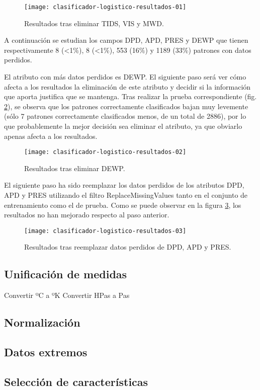 \begin{figure}[ht]
    \centering
    \texttt{[image: clasificador-logistico-resultados-01]}
    \caption{Resultados tras eliminar TIDS, VIS y MWD.}
    \label{fig:clasificador-logistico-resultados-01}
\end{figure}

A continuación se estudian los campos DPD, APD, PRES y DEWP que tienen respectivamente 8 (<1\%), 8 (<1\%), 553 (16\%) y 1189 (33\%) patrones con datos perdidos.

El atributo con más datos perdidos es DEWP. El siguiente paso será ver cómo afecta a los resultados la eliminación de este atributo y decidir si la información que aporta justifica que se mantenga. Tras realizar la prueba correspondiente (fig. \ref{fig:clasificador-logistico-resultados-02}), se observa que los patrones correctamente clasificados bajan muy levemente (sólo 7 patrones correctamente clasificados menos, de un total de 2886), por lo que probablemente la mejor decisión sea eliminar el atributo, ya que obviarlo apenas afecta a los resultados.

\begin{figure}[ht]
    \centering
    \texttt{[image: clasificador-logistico-resultados-02]}
    \caption{Resultados tras eliminar DEWP.}
    \label{fig:clasificador-logistico-resultados-02}
\end{figure}

El siguiente paso ha sido reemplazar los datos perdidos de los atributos DPD, APD y PRES utilizando el filtro ReplaceMissingValues tanto en el conjunto de entrenamiento como el de prueba. Como se puede observar en la figura \ref{fig:clasificador-logistico-resultados-03}, los resultados no han mejorado respecto al paso anterior.

\begin{figure}[ht]
    \centering
    \texttt{[image: clasificador-logistico-resultados-03]}
    \caption{Resultados tras reemplazar datos perdidos de DPD, APD y PRES.}
    \label{fig:clasificador-logistico-resultados-03}
\end{figure}

\subsection{Unificación de medidas}
Convertir ºC a ºK
Convertir HPas a Pas

\subsection{Normalización}


\subsection{Datos extremos}


\subsection{Selección de características}

